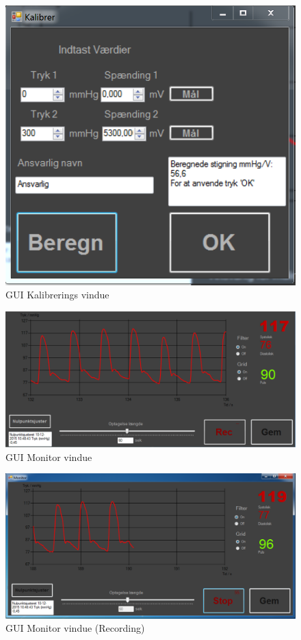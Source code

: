 \begin{figure}[H]
	\centering
	\includegraphics[width=1\textwidth]{Figurer/Kalibreringdone}
	\caption{GUI  Kalibrerings vindue}
	\label{fig:GUI  Kalibrering done}
\end{figure}

\begin{figure}[H]
	\centering
	\includegraphics[width=1\textwidth]{Figurer/m}
	\caption{GUI  Monitor vindue}
	\label{fig:GUI  Monitor vindue}
\end{figure}

\begin{figure}[H]
	\centering
	\includegraphics[width=1\textwidth]{Figurer/Monitor_vindue_Recording}
	\caption{GUI  Monitor vindue (Recording)}
	\label{fig:GUI  Monitor vindue (Recording}
\end{figure}

